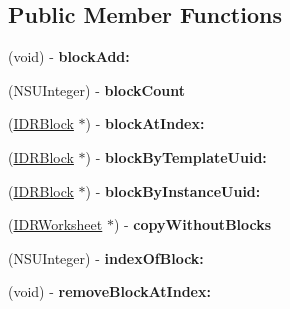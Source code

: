 \subsection*{Public Member Functions}
\begin{DoxyCompactItemize}
\item 
\hypertarget{interface_i_d_r_worksheet_a5e893bcac77d0a924e8fd30bb5362443}{
(void) -\/ {\bfseries blockAdd:}}
\label{interface_i_d_r_worksheet_a5e893bcac77d0a924e8fd30bb5362443}

\item 
\hypertarget{interface_i_d_r_worksheet_ae8b526c5fb2d988e1ec1d9e3ec41241f}{
(NSUInteger) -\/ {\bfseries blockCount}}
\label{interface_i_d_r_worksheet_ae8b526c5fb2d988e1ec1d9e3ec41241f}

\item 
\hypertarget{interface_i_d_r_worksheet_aa830b99311dfb916a38ff9801259c881}{
(\hyperlink{interface_i_d_r_block}{IDRBlock} $\ast$) -\/ {\bfseries blockAtIndex:}}
\label{interface_i_d_r_worksheet_aa830b99311dfb916a38ff9801259c881}

\item 
\hypertarget{interface_i_d_r_worksheet_a118bb092e260d7b08f4e11094993cadc}{
(\hyperlink{interface_i_d_r_block}{IDRBlock} $\ast$) -\/ {\bfseries blockByTemplateUuid:}}
\label{interface_i_d_r_worksheet_a118bb092e260d7b08f4e11094993cadc}

\item 
\hypertarget{interface_i_d_r_worksheet_a7440595f5abf9b12c470cdba88c6c600}{
(\hyperlink{interface_i_d_r_block}{IDRBlock} $\ast$) -\/ {\bfseries blockByInstanceUuid:}}
\label{interface_i_d_r_worksheet_a7440595f5abf9b12c470cdba88c6c600}

\item 
\hypertarget{interface_i_d_r_worksheet_acf88e2de4ea926d5132a8660cd143dc3}{
(\hyperlink{interface_i_d_r_worksheet}{IDRWorksheet} $\ast$) -\/ {\bfseries copyWithoutBlocks}}
\label{interface_i_d_r_worksheet_acf88e2de4ea926d5132a8660cd143dc3}

\item 
\hypertarget{interface_i_d_r_worksheet_a34bf8e978053f174add616f5acf290a8}{
(NSUInteger) -\/ {\bfseries indexOfBlock:}}
\label{interface_i_d_r_worksheet_a34bf8e978053f174add616f5acf290a8}

\item 
\hypertarget{interface_i_d_r_worksheet_ab831b46589d33eb354fdb9e468ec82d5}{
(void) -\/ {\bfseries removeBlockAtIndex:}}
\label{interface_i_d_r_worksheet_ab831b46589d33eb354fdb9e468ec82d5}

\end{DoxyCompactItemize}
